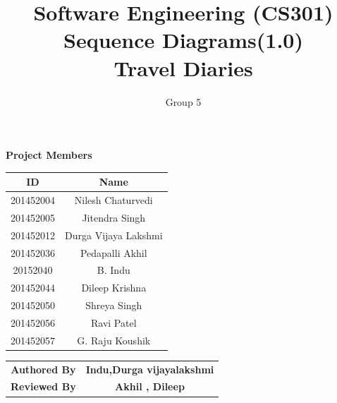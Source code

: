 \documentclass{article}
\title{Software Engineering (CS301)\\ Sequence Diagrams(1.0)\\Travel Diaries}
\author{Group 5}
\begin{document}
\maketitle
\begin{center}
\textbf{Project Members}\\
\vspace*{.6cm}
\begin{tabular}{|c|c|}
\hline
\textbf{ID} & \textbf{Name}\\
\hline
\hline
201452004 & Nilesh Chaturvedi\\
\hline
201452005 & Jitendra Singh\\
\hline
201452012 & Durga Vijaya Lakshmi\\
\hline
201452036 & Pedapalli Akhil\\
\hline
20152040 & B. Indu\\
\hline
201452044 & Dileep Krishna\\
\hline
201452050 & Shreya Singh\\
\hline
201452056 & Ravi Patel\\
\hline
201452057 & G. Raju Koushik\\
\hline
\end{tabular}

\vspace*{1cm}

\begin{tabular}{|c|c|}
\hline
\textbf{Authored By} & \textbf{Indu,Durga vijayalakshmi}\\
\textbf{Reviewed By} & \textbf{Akhil , Dileep }\\
\hline
\end{tabular}
\end{center}
\end{document}
